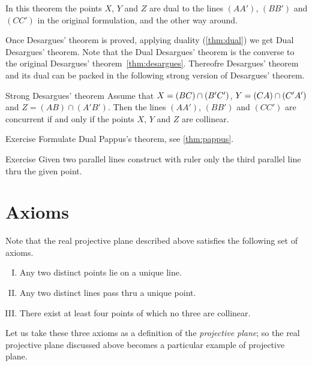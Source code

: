 In this theorem the points $X$, $Y$ and $Z$ 
are dual to the lines $(AA')$, $(BB')$ and $(CC')$ in the original formulation, and the other way around.

Once Desargues' theorem is proved, applying duality (\ref{thm:dual})
we get Dual Desargues' theorem.
Note that the  Dual Desargues' theorem is the converse to the original Desargues' theorem~\ref{thm:desargues}.
Thereofre Desargues' theorem and its dual can be packed in the
following strong version of Desargues' theorem.

\begin{thm}{Strong Desargues' theorem}
Assume that $X\z=(BC)\z\cap (B'C')$, $Y\z=(CA)\cap (C'A')$ and $Z=(AB)\cap (A'B')$.
Then the lines  $(AA')$, $(BB')$ and $(CC')$ are concurrent if and only if the  points $X$, $Y$ and $Z$ are collinear.
\end{thm}


\begin{thm}{Exercise}\label{ex:dual-pappus}
Formulate Dual Pappus's theorem, see \ref{thm:pappus}.
\end{thm}

\begin{thm}{Exercise}\label{ex:dual-desargues-construction}
Given two parallel lines construct with ruler only the third parallel line thru the given point.
\end{thm}

\section*{Axioms}

Note that the real projective plane described above satisfies the following set of axioms.

\begin{enumerate}[I.]
\item\label{def:proj-axioms:1} Any two distinct points lie on a unique line.
\item\label{def:proj-axioms:2} Any two distinct lines pass thru a unique point.
\item\label{def:proj-axioms:3} There exist at least four points of which no three are collinear.
\end{enumerate}

Let us take these three axioms as a definition of the \emph{projective plane};
so the real projective plane discussed above becomes a particular example of projective plane.

